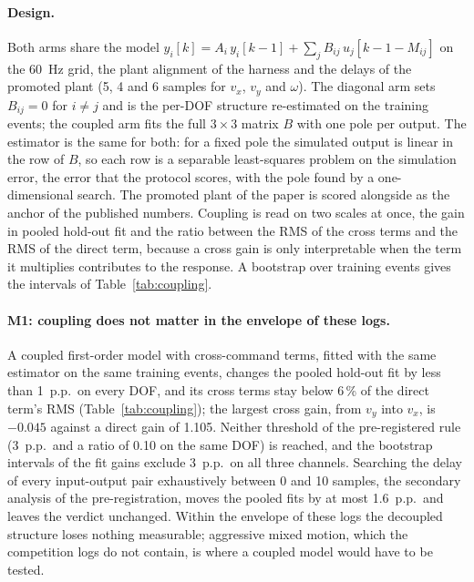\paragraph{Design.} Both arms share the model $y_i[k] = A_i\,y_i[k-1] + \sum_j B_{ij}\,u_j[k-1-M_{ij}]$ on the 60~Hz grid, the plant alignment of the harness and the delays of the promoted plant (5, 4 and 6 samples for $v_x$, $v_y$ and $\omega$). The diagonal arm sets $B_{ij} = 0$ for $i \neq j$ and is the per-DOF structure re-estimated on the training events; the coupled arm fits the full $3 \times 3$ matrix $B$ with one pole per output. The estimator is the same for both: for a fixed pole the simulated output is linear in the row of $B$, so each row is a separable least-squares problem on the simulation error, the error that the protocol scores, with the pole found by a one-dimensional search. The promoted plant of the paper is scored alongside as the anchor of the published numbers. Coupling is read on two scales at once, the gain in pooled hold-out fit and the ratio between the RMS of the cross terms and the RMS of the direct term, because a cross gain is only interpretable when the term it multiplies contributes to the response. A bootstrap over training events gives the intervals of Table~\ref{tab:coupling}.

\paragraph{M1: coupling does not matter in the envelope of these logs.} A coupled first-order model with cross-command terms, fitted with the same estimator on the same training events, changes the pooled hold-out fit by less than 1~p.p.\ on every DOF, and its cross terms stay below 6\,\% of the direct term's RMS (Table~\ref{tab:coupling}); the largest cross gain, from $v_y$ into $v_x$, is $-0.045$ against a direct gain of 1.105. Neither threshold of the pre-registered rule (3~p.p.\ and a ratio of 0.10 on the same DOF) is reached, and the bootstrap intervals of the fit gains exclude 3~p.p.\ on all three channels. Searching the delay of every input-output pair exhaustively between 0 and 10 samples, the secondary analysis of the pre-registration, moves the pooled fits by at most 1.6~p.p.\ and leaves the verdict unchanged. Within the envelope of these logs the decoupled structure loses nothing measurable; aggressive mixed motion, which the competition logs do not contain, is where a coupled model would have to be tested.

